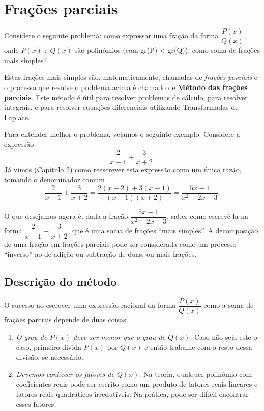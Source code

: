 \chapter{Frações parciais}

\begin{obs}
Considere o seguinte problema:  como expressar uma fração da forma $\dfrac{P(x)}{Q(x)}$, onde $P(x)$ e $Q(x)$ são polinômios (com gr(P) < gr(Q)), como soma de frações mais simples?
\end{obs}

Estas frações mais simples são, matematicamente, chamadas de \textit{frações parciais} e o processo que resolve o problema acima é chamado de \textbf{Método das frações parciais}. Este método é útil para resolver problemas de cálculo, para resolver integrais, e para resolver equações diferenciais utilizando Transformadas de Laplace. 

Para entender melhor o problema, vejamos o seguinte exemplo. Considere a expressão
\begin{equation*}
    \frac{2}{x-1}+\frac{3}{x+2}.
\end{equation*}
Já vimos (Capítulo 2) como reescrever esta expressão como um única razão, tomando o denominador comum
\begin{equation*}
    \frac{2}{x-1}+\frac{3}{x+2} = \frac{2(x+2)+3(x-1)}{(x-1)(x+2)} = 
    \frac{5x-1}{x^2 - 2x - 3}.
\end{equation*}

O que desejamos agora é, dada a fração $\dfrac{5x-1}{x^2 - 2x - 3}$, saber como escrevê-la na forma $ \dfrac{2}{x-1}+\dfrac{3}{x+2}$, que é uma soma de frações ``mais simples''. A decomposição de uma fração em frações parciais pode ser considerada como um processo ``inverso'' ao de adição ou subtração de duas, ou mais frações.

\section{Descrição do método}

O sucesso ao escrever uma expressão racional da forma $\dfrac{P(x)}{Q(x)}$ como a soma de frações parciais depende de duas coisas:
\begin{enumerate}
\item \textit{O grau de $P(x)$ deve ser menor que o grau de $Q(x)$}. Caso não seja este o caso, primeiro divida $P(x)$ por $Q(x)$ e então trabalhe com o resto dessa divisão, se necessário.

\item \textit{Devemos conhecer os fatores de $Q(x)$}. Na teoria, qualquer polinômio com coeficientes reais pode ser escrito como um produto de fatores reais lineares e fatores reais quadráticos irredutíveis. Na prática, pode ser difícil encontrar esses fatores.

\end{enumerate}

